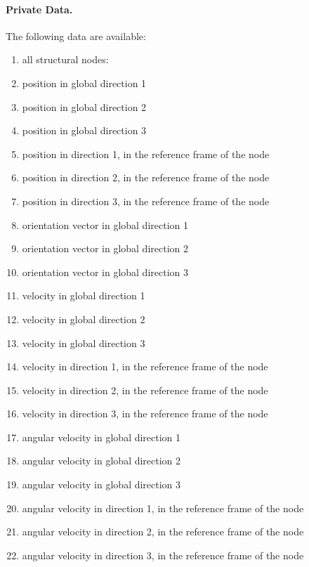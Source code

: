 \paragraph{Private Data.}
\label{sec:NODE:STRUCTURAL:PRIV}
The following data are available:
\begin{enumerate}
\item[] all structural nodes:
\item {} position in global direction 1
\item {} position in global direction 2
\item {} position in global direction 3
\item {} position in direction 1, in the reference frame of the node
\item {} position in direction 2, in the reference frame of the node
\item {} position in direction 3, in the reference frame of the node
\item {} orientation vector in global direction 1
\item {} orientation vector in global direction 2
\item {} orientation vector in global direction 3
\item {} velocity in global direction 1
\item {} velocity in global direction 2
\item {} velocity in global direction 3
\item {} velocity in direction 1, in the reference frame of the node
\item {} velocity in direction 2, in the reference frame of the node
\item {} velocity in direction 3, in the reference frame of the node
\item {} angular velocity in global direction 1
\item {} angular velocity in global direction 2
\item {} angular velocity in global direction 3
\item {} angular velocity in direction 1, in the reference frame of the node
\item {} angular velocity in direction 2, in the reference frame of the node
\item {} angular velocity in direction 3, in the reference frame of the node

\end{enumerate}
